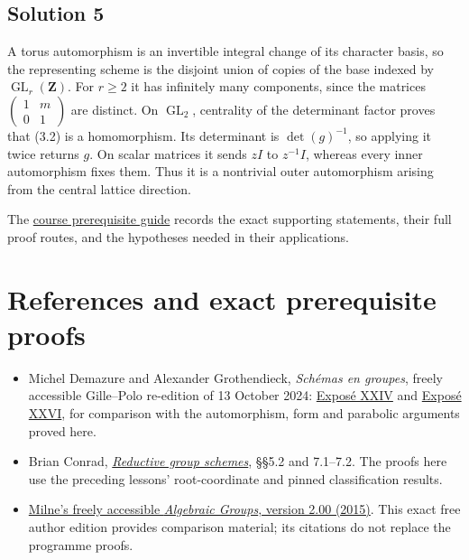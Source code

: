 \documentclass[11pt,a4paper,openany]{report}
\providecommand{\tightlist}{\setlength{\itemsep}{0pt}\setlength{\parskip}{0pt}}
\begin{document}
\subsection{Solution 5}\label{AG-RG-06-solution-5}

A torus automorphism is an invertible integral change of its character basis, so the representing scheme is the disjoint union of copies of the base indexed by \(\operatorname{GL}_r(\mathbf Z)\). For \(r\geq2\) it has infinitely many components, since the matrices \(\left(\begin{smallmatrix}1&m\\0&1\end{smallmatrix}\right)\) are distinct. On \(\operatorname{GL}_2\), centrality of the determinant factor proves that (3.2) is a homomorphism. Its determinant is \(\det(g)^{-1}\), so applying it twice returns \(g\). On scalar matrices it sends \(zI\) to \(z^{-1}I\), whereas every inner automorphism fixes them. Thus it is a nontrivial outer automorphism arising from the central lattice direction.

The \href{prerequisites.html}{course prerequisite guide} records the exact supporting statements, their full proof routes, and the hypotheses needed in their applications.

\section{References and exact prerequisite proofs}\label{AG-RG-06-references-and-exact-prerequisite-proofs}

\begin{itemize}
\tightlist
\item
  Michel Demazure and Alexander Grothendieck, \emph{Schémas en groupes}, freely accessible Gille--Polo re-edition of 13 October 2024: \href{https://webusers.imj-prg.fr/~patrick.polo/SGA3/Exp24-13oct24.pdf}{Exposé XXIV} and \href{https://webusers.imj-prg.fr/~patrick.polo/SGA3/Exp26-13oct24.pdf}{Exposé XXVI}, for comparison with the automorphism, form and parabolic arguments proved here.
\item
  Brian Conrad, \href{https://math.stanford.edu/~conrad/papers/luminysga3.pdf}{\emph{Reductive group schemes}}, §§5.2 and 7.1--7.2. The proofs here use the preceding lessons' root-coordinate and pinned classification results.
\item
  \href{https://www.jmilne.org/math/CourseNotes/iAG200.pdf}{Milne's freely accessible \emph{Algebraic Groups}, version 2.00 (2015)}. This exact free author edition provides comparison material; its citations do not replace the programme proofs.
\end{itemize}
\end{document}
